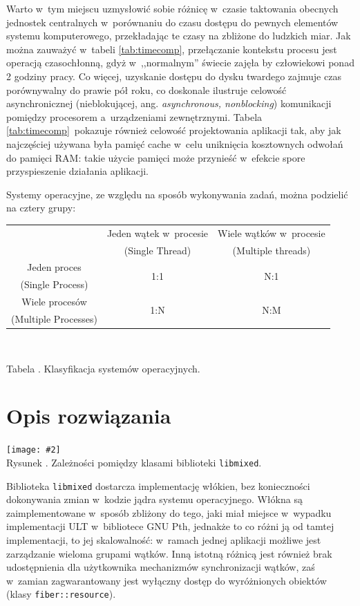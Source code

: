 \documentclass[12pt,makeidx]{mwart}
\newcommand{\code}{\texttt}
\newcommand{\dcolon}{::}
\newcounter{tabmain}
\newcommand{\mytabcaption}[1]{ \begin{center}Tabela \arabic{tabmain}. #1.\end{center} \addtocounter{tabmain}{1} }
\newcounter{figmain}
\newcommand{\myownfigure}[4]{ \newcounter{#1} \setcounter{#1}{\value{figmain}} \addtocounter{figmain}{1} \begin{center} \label{fig:#1} \centering \texttt{[image: \#2]}\\ \nopagebreak[4] Rysunek \arabic{#1}. #3. \end{center}}
\begin{document}
	Warto w~tym miejscu uzmysłowić sobie różnicę w~czasie taktowania obecnych jednostek centralnych w~porównaniu do czasu dostępu do pewnych
	elementów systemu komputerowego, przekładając te czasy na zbliżone do ludzkich miar. Jak można zauważyć w~tabeli \ref{tab:timecomp},
	przełączanie kontekstu procesu jest operacją czasochłonną, gdyż w~,,normalnym'' świecie zajęła by człowiekowi ponad 2 godziny pracy.
	Co więcej, uzyskanie dostępu do dysku twardego zajmuje czas porównywalny do prawie pół roku, co doskonale ilustruje celowość asynchronicznej
	(nieblokującej, ang. \emph{asynchronous, non\dywiz{}blocking}) komunikacji pomiędzy procesorem a~urządzeniami zewnętrznymi.
	Tabela \ref{tab:timecomp}~pokazuje również celowość projektowania aplikacji tak, aby jak najczęściej używana była pamięć cache w~celu uniknięcia
	kosztownych odwołań do pamięci RAM: takie użycie pamięci może przynieść w~efekcie spore przyspieszenie działania aplikacji.
\par
%
\indent
	Systemy operacyjne, ze względu na sposób wykonywania zadań, można podzielić na cztery grupy:
	\begin{center}
	\centering
	\begin{tabular}{|c|c|c|} \hline
													 & Jeden wątek w~procesie   	 & Wiele wątków w~procesie \\
													 & (Single Thread)          	 & (Multiple threads)      \\\hline
			Jeden proces         & \multirow{2}{*}{1:1} 	     & \multirow{2}{*}{N:1}	 \\
			(Single Process)     &  										   		 &  									     \\\hline
			Wiele procesów       & \multirow{2}{*}{1:N}       & \multirow{2}{*}{N:M}   \\
			(Multiple Processes) &                             &                         \\\hline
	\end{tabular}\\
	\mytabcaption{Klasyfikacja systemów operacyjnych}
	\end{center}
\par
%
\newpage
\section{Opis rozwiązania}
\label{sec:solution}
\begin{center}
  \myownfigure{libmixedoverview}{libmixedOverview.png}{Zależności pomiędzy klasami biblioteki \code{libmixed}}{.7}
\end{center}
\indent
	Biblioteka \code{libmixed} dostarcza implementację włókien, bez konieczności dokonywania zmian w~kodzie jądra systemu operacyjnego.
	Włókna są zaimplementowane w~sposób zbliżony do tego, jaki miał miejsce w~wypadku implementacji ULT w~bibliotece GNU Pth, jednakże to
	co różni ją od tamtej implementacji, to jej skalowalność: w~ramach jednej aplikacji możliwe jest zarządzanie wieloma grupami wątków.
	Inną istotną różnicą jest również brak udostępnienia dla użytkownika mechanizmów synchronizacji wątków, zaś w~zamian zagwarantowany
	jest wyłączny dostęp do wyróżnionych obiektów (klasy \code{fiber\dcolon resource}).
\par
%
\end{document}
